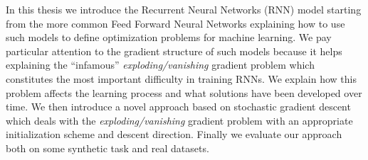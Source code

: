  
In this thesis we introduce the Recurrent Neural Networks (RNN) model starting from the more common Feed Forward Neural Networks explaining how to use such models to define optimization problems for machine learning. We pay particular attention to the gradient structure of such models because it helps explaining the ``infamous'' \textit{exploding/vanishing} gradient problem which constitutes the most important difficulty in training RNNs. We explain how this problem affects the learning process and what solutions have been developed over time. We then introduce a novel approach based on stochastic gradient descent which deals with the \textit{exploding/vanishing} gradient problem with an appropriate initialization scheme and descent direction. Finally we evaluate our approach both on some synthetic task and real datasets.